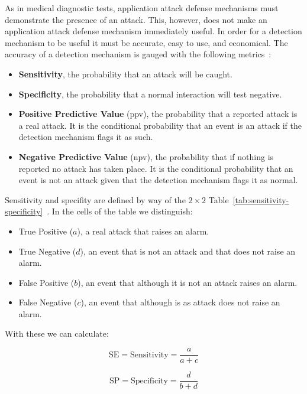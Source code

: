 \documentclass[conference]{IEEEtran}
\begin{document}
As in medical diagnostic tests, application attack defense mechanisms
must demonstrate the presence of an attack. This, however, does not
make an application attack defense mechanism immediately useful. In
order for a detection mechanism to be useful it must be accurate, easy to
use, and economical. The accuracy of a detection mechanism is gauged
with the following metrics~\cite{TDR2013,GFDLS06,A00}:
\begin{itemize}
\item {\bf Sensitivity}, the probability that an attack will be
  caught.
\item {\bf Specificity}, the probability that a normal interaction
  will test negative.
\item {\bf Positive Predictive Value} ({\sc ppv}), the probability that a
  reported attack is a real attack. It is the conditional probability
  that an event is an attack if the detection mechanism flags it as
  such. 
\item {\bf Negative Predictive Value} ({\sc npv}), the probability that if
  nothing is reported no attack has taken place. It is the conditional
  probability that an event is not an attack given that the detection
  mechanism flags it as normal.
\end{itemize}

Sensitivity and specifity are defined by way of the $2\times 2$
Table~\ref{tab:sensitivity-specificity}~\cite{linn2004}. 
In the cells of
the table we distinguish:
\begin{itemize}
\item True Positive ($a$), a real attack that raises an alarm.
\item True Negative ($d$), an event that is not an attack and that does
  not raise an alarm.
\item False Positive ($b$), an event that although it is not an attack
  raises an alarm.
\item False Negative ($c$), an event that although is as attack does
  not raise an alarm.
\end{itemize}

\noindent
With these we can calculate:

\begin{equation}
\textrm{SE} = \textrm{Sensitivity} = \frac{a}{a + c}
\end{equation}

\begin{equation}
\textrm{SP} = \textrm{Specificity} = \frac{d}{b + d}
\end{equation}
\end{document}
